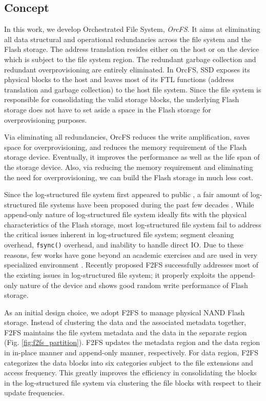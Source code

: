 \documentclass[pageno]{jpaper}
\begin{document}
\subsection{Concept}
In this work, we develop Orchestrated File System, \emph{OrcFS}. It
aims at eliminating all data structural and operational redundancies
across the file system and the Flash storage. The address translation
resides either on the host or on the device which is subject to the
file system region. The redundant garbage collection and redundant
overprovisioning are entirely eliminated.  In OrcFS, SSD exposes its
physical blocks to the host and leaves most of its FTL functions
(address translation and garbage collection) to the host
file system. Since the file system is responsible for consolidating the
valid storage blocks, the underlying Flash storage does not have to
set aside a space in the Flash storage for overprovisioning
purposes.


Via eliminating all redundancies, OrcFS reduces the write
amplification, saves space for overprovisioning, and reduces the memory
requirement of the Flash storage device. Eventually, it improves the
performance as well as the life span of the storage device. Also, via
reducing the memory requirement and eliminating the need for
overprovisioning, we can build the Flash storage in much less cost.

Since the log-structured file system first appeared to public
\cite{rosenblum1992design}, a fair amount of log-structured file systems
have been proposed during the past few decades \cite{engel2005logfs,
  nilfs2006, lee2015f2fs, czezatke2000linlogfs, starwind_lsfs}. While
append-only nature of log-structured file system ideally fits with
the physical characteristics of the Flash storage, most log-structured
file system fail to address the critical issues inherent in
log-structured file system; segment cleaning overhead, \texttt{fsync()}
overhead, and inability to handle direct IO. Due to these reasons, few
works have gone beyond an academic exercises and are used in very
specialized environment \cite{nilfs2006}. Recently proposed F2FS
\cite{lee2015f2fs} successfully addresses most of the existing issues in
log-structured file system; it properly exploits the append-only nature of the device
and shows good random write performance of Flash storage.

As an initial design choice, we adopt F2FS to manage physical NAND
Flash storage. Instead of clustering the data and the associated
metadata together, F2FS maintains the file system metadata and the
data in the separate region (Fig. \ref{fig:f2fs_partition}).  F2FS
updates the metadata region and the data region in in-place manner and
append-only manner, respectively.  For data region, F2FS categorizes
the data blocks into six categories subject to the file extensions and
access frequency. This greatly improves the efficiency in
consolidating the blocks in the log-structured file system via
clustering the file blocks with respect to their update frequencies.
\end{document}
